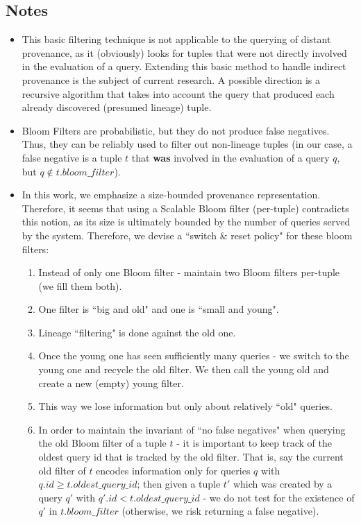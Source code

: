 \subsection{Notes} 
\begin{itemize}
    \item This basic filtering technique is not applicable to the querying of distant provenance, as it (obviously) looks for tuples that were not directly involved in the evaluation of a query. Extending this basic method to handle indirect provenance is the subject of current research. A possible direction is a recursive algorithm that takes into account the query that produced each already discovered (presumed lineage) tuple.
    \item Bloom Filters are probabilistic, but they do not produce false negatives. Thus, they can be reliably used to filter out non-lineage tuples (in our case, a false negative is a tuple $t$ that \textbf{was} involved in the evaluation of a query $q$, but $q \notin t.bloom\_filter$). 
    \item In this work, we emphasize a size-bounded provenance representation. Therefore, it seems that using a Scalable Bloom filter (per-tuple) contradicts this notion, as its size is ultimately bounded by the number of queries served by the system. Therefore, we devise a ``switch \& reset policy" for these bloom filters:
    \begin{enumerate}
        \item Instead of only one Bloom filter - maintain two Bloom filters per-tuple (we fill them both).
        \item One filter is ``big and old" and one is ``small and young".
        \item Lineage ``filtering" is done against the old one.
        \item Once the young one has seen sufficiently many queries - we switch to the young one and recycle the old filter. We then call the young old and create a new (empty) young filter.
        \item This way we lose information but only about relatively ``old" queries.
        \item In order to maintain the invariant of ``no false negatives" when querying the old Bloom filter of a tuple $t$ - it is important to keep track of the oldest query id that is tracked by the old filter. That is, say the current old filter of $t$ encodes information only for queries $q$ with $q.id \geq t.oldest\_query\_id$\footnotemark; then given a tuple $t'$ which was created by a query $q'$ with $q'.id < t.oldest\_query\_id$ - we do not test for the existence of $q'$ in $t.bloom\_filter$ (otherwise, we risk returning a false negative).

\end{enumerate}
\end{itemize}
